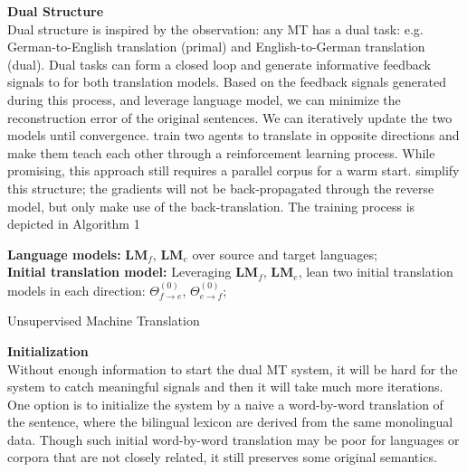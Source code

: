 \textbf{Dual Structure}\\
Dual structure is inspired by the observation: any MT has a dual task: e.g. German-to-English translation (primal) and English-to-German translation (dual). Dual tasks can form a closed loop and generate informative  feedback signals to for both translation models. Based on the feedback signals generated during this process, and leverage language model, we can minimize the reconstruction error of the original sentences. We can iteratively update the two models until convergence.   \cite{he2016dual} train two agents to translate in opposite directions and make them teach each other through a reinforcement learning process. While promising, this approach still requires a parallel corpus for a warm start. \cite{lample2018phrase} simplify this structure; the gradients will not be back-propagated through the reverse model, but only make use of the back-translation. The training process is depicted in Algorithm 1 \cite{lample2018phrase}\\


\begin{algorithm}[h]
	\SetAlgoLined
	\textbf{Language models:} $\textbf{LM}_f$, $\textbf{LM}_e$ over source and target languages;\\
	\textbf{Initial translation model:}  Leveraging $\textbf{LM}_f$, $\textbf{LM}_e$, lean two initial translation models in each direction: $\Theta_{f\rightarrow e}^{(0)}$, ${\Theta_{e \rightarrow f}^{(0)}}$;\\
	\caption{Unsupervised Machine Translation}
\end{algorithm}


\textbf{Initialization}\\
Without enough information to start the dual MT system, it will be hard for the system to catch meaningful signals and then it will take much more iterations. One option is to initialize the system by a naive a word-by-word translation of the sentence, where the bilingual lexicon are derived from the same monolingual data. Though such initial word-by-word translation may be poor for languages or corpora that are not closely related, it still preserves some  original semantics.\\


